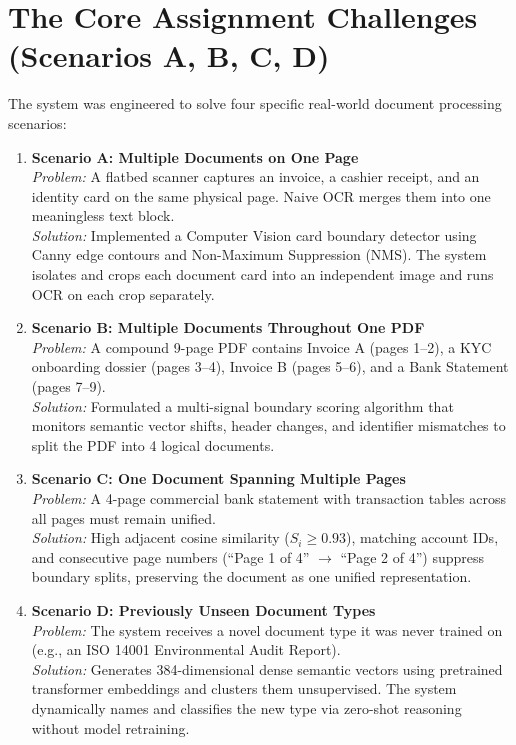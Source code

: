 \documentclass[11pt,a4paper]{article}
\begin{document}
\section{The Core Assignment Challenges (Scenarios A, B, C, D)}
The system was engineered to solve four specific real-world document processing scenarios:

\begin{enumerate}[leftmargin=*]
    \item \textbf{Scenario A: Multiple Documents on One Page} \\
    \textit{Problem:} A flatbed scanner captures an invoice, a cashier receipt, and an identity card on the same physical page. Naive OCR merges them into one meaningless text block. \\
    \textit{Solution:} Implemented a Computer Vision card boundary detector using Canny edge contours and Non-Maximum Suppression (NMS). The system isolates and crops each document card into an independent image and runs OCR on each crop separately.
    
    \item \textbf{Scenario B: Multiple Documents Throughout One PDF} \\
    \textit{Problem:} A compound 9-page PDF contains Invoice A (pages 1--2), a KYC onboarding dossier (pages 3--4), Invoice B (pages 5--6), and a Bank Statement (pages 7--9). \\
    \textit{Solution:} Formulated a multi-signal boundary scoring algorithm that monitors semantic vector shifts, header changes, and identifier mismatches to split the PDF into 4 logical documents.

    \item \textbf{Scenario C: One Document Spanning Multiple Pages} \\
    \textit{Problem:} A 4-page commercial bank statement with transaction tables across all pages must remain unified. \\
    \textit{Solution:} High adjacent cosine similarity ($S_i \ge 0.93$), matching account IDs, and consecutive page numbers (``Page 1 of 4'' $\to$ ``Page 2 of 4'') suppress boundary splits, preserving the document as one unified representation.

    \item \textbf{Scenario D: Previously Unseen Document Types} \\
    \textit{Problem:} The system receives a novel document type it was never trained on (e.g., an ISO 14001 Environmental Audit Report). \\
    \textit{Solution:} Generates 384-dimensional dense semantic vectors using pretrained transformer embeddings and clusters them unsupervised. The system dynamically names and classifies the new type via zero-shot reasoning without model retraining.
\end{enumerate}
\end{document}
